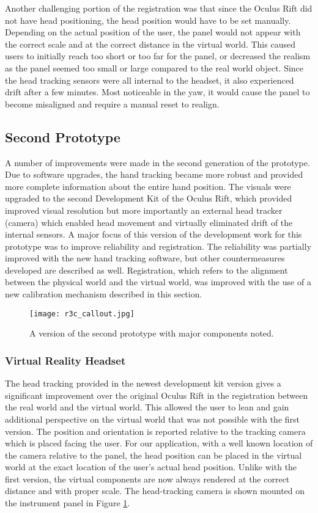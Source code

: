 Another challenging portion of the registration was that since the Oculus Rift did not have head positioning, the head position would have to be set manually.
Depending on the actual position of the user, the panel would not appear with the correct scale and at the correct distance in the virtual world.
This caused users to initially reach too short or too far for the panel, or decreased the realism as the panel seemed too small or large compared to the real world object.
Since the head tracking sensors were all internal to the headset, it also experienced drift after a few minutes.
Most noticeable in the yaw, it would cause the panel to become misaligned and require a manual reset to realign.

\subsection{Second Prototype}

A number of improvements were made in the second generation of the prototype.
Due to software upgrades, the hand tracking became more robust and provided more complete information about the entire hand position.
The visuals were upgraded to the second Development Kit of the Oculus Rift, which provided improved visual resolution but more importantly an external head tracker (camera) which enabled head movement and virtually eliminated drift of the internal sensors.
A major focus of this version of the development work for this prototype was to improve reliability and registration.
The reliability was partially improved with the new hand tracking software, but other countermeasures developed are described as well.
Registration, which refers to the alignment between the physical world and the virtual world, was improved with the use of a new calibration mechanism described in this section.

\begin{figure}
    \centering
    \texttt{[image: r3c\_callout.jpg]}
    \caption{A version of the second prototype with major components noted.}
    \label{fig:r3c_callout}
\end{figure}

\subsubsection{Virtual Reality Headset}

The head tracking provided in the newest development kit version gives a significant improvement over the original Oculus Rift in the registration between the real world and the virtual world.
This allowed the user to lean and gain additional perspective on the virtual world that was not possible with the first version.
The position and orientation is reported relative to the tracking camera which is placed facing the user.
For our application, with a well known location of the camera relative to the panel, the head position can be placed in the virtual world at the exact location of the user's actual head position.
Unlike with the first version, the virtual components are now always rendered at the correct distance and with proper scale.
The head-tracking camera is shown mounted on the instrument panel in Figure \ref{fig:r3c_callout}.


